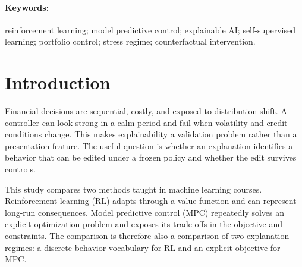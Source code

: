 \documentclass[11pt,a4paper]{article}
\begin{document}


\begin{abstract}
This project report compares a tabular reinforcement-learning portfolio controller with a transparent receding-horizon model-predictive controller on a real US market stress panel. The dataset contains market and macro series; the tabular RL state uses SPY trend, VIX percentile, and HYG--LQD relative performance. The RL controller is trained on 2010--2017 data. A validation period from 2018--2021 selects one primitive intervention, while the frozen test from 2022-01-03 to 2023-02-28 is used for the historical before--after comparison. On the frozen test, baseline RL has Sharpe $-0.653$ and maximum drawdown $-21.71\%$; baseline MPC has Sharpe $0.322$ and maximum drawdown $-6.62\%$. A train-only behavior vocabulary identifies a stress-overexposure primitive. Mapping it to cash preservation improves RL to Sharpe $-0.460$ and maximum drawdown $-14.95\%$, with a control-adjusted Sharpe lift of $+0.214$ against twenty matched-random repairs. Robust MPC reaches Sharpe $1.990$ on the exploratory 2023--2026 outer holdout with maximum drawdown $-7.44\%$. The results support explainability as a debugging and control interface, while the outer holdout also shows that a local RL repair is not a universal improvement.
\end{abstract}

\paragraph{Keywords:} reinforcement learning; model predictive control; explainable AI; self-supervised learning; portfolio control; stress regime; counterfactual intervention.

\section{Introduction}
Financial decisions are sequential, costly, and exposed to distribution shift. A controller can look strong in a calm period and fail when volatility and credit conditions change. This makes explainability a validation problem rather than a presentation feature. The useful question is whether an explanation identifies a behavior that can be edited under a frozen policy and whether the edit survives controls.

This study compares two methods taught in machine learning courses. Reinforcement learning (RL) adapts through a value function and can represent long-run consequences. Model predictive control (MPC) repeatedly solves an explicit optimization problem and exposes its trade-offs in the objective and constraints. The comparison is therefore also a comparison of two explanation regimes: a discrete behavior vocabulary for RL and an explicit objective for MPC.
\end{document}
